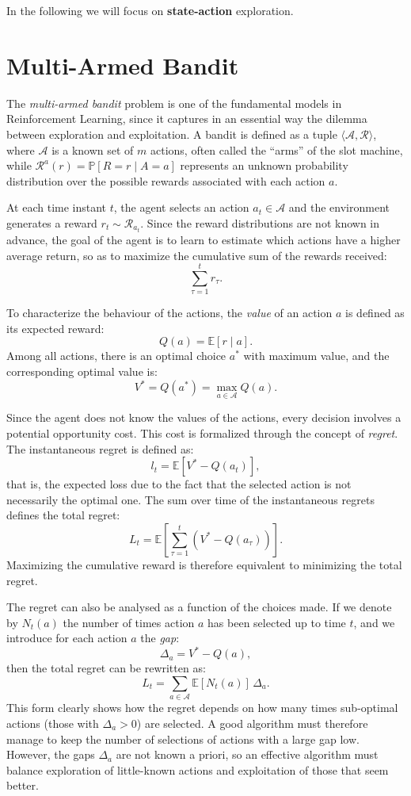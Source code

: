 In the following we will focus on \textbf{state-action} exploration.

\section{Multi-Armed Bandit}
The \emph{multi-armed bandit} problem is one of the fundamental models in Reinforcement Learning, since it captures in an essential way the dilemma between exploration and exploitation. A bandit is defined as a tuple $\langle \mathcal{A}, \mathcal{R} \rangle$, where $\mathcal{A}$ is a known set of $m$ actions, often called the ``arms'' of the slot machine, while $\mathcal{R}^a(r) = \mathbb{P}[R=r \mid A=a]$ represents an unknown probability distribution over the possible rewards associated with each action $a$.

At each time instant $t$, the agent selects an action $a_t \in \mathcal{A}$ and the environment generates a reward $r_t \sim \mathcal{R}_{a_t}$. Since the reward distributions are not known in advance, the goal of the agent is to learn to estimate which actions have a higher average return, so as to maximize the cumulative sum of the rewards received:
\[
\sum_{\tau=1}^t r_\tau .
\]

To characterize the behaviour of the actions, the \emph{value} of an action $a$ is defined as its expected reward:
\[
Q(a) = \mathbb{E}[r \mid a].
\]
Among all actions, there is an optimal choice $a^*$ with maximum value, and the corresponding optimal value is:
\[
V^* = Q(a^*) = \max_{a \in \mathcal{A}} Q(a).
\]

Since the agent does not know the values of the actions, every decision involves a potential opportunity cost. This cost is formalized through the concept of \emph{regret}. The instantaneous regret is defined as:
\[
l_t = \mathbb{E}\!\left[ V^* - Q(a_t) \right],
\]
that is, the expected loss due to the fact that the selected action is not necessarily the optimal one. The sum over time of the instantaneous regrets defines the total regret:
\[
L_t = \mathbb{E}\!\left[ \sum_{\tau=1}^t \left( V^* - Q(a_\tau) \right) \right].
\]
Maximizing the cumulative reward is therefore equivalent to minimizing the total regret.

The regret can also be analysed as a function of the choices made. If we denote by $N_t(a)$ the number of times action $a$ has been selected up to time $t$, and we introduce for each action $a$ the \emph{gap}:
\[
\Delta_a = V^* - Q(a),
\]
then the total regret can be rewritten as:
\[
L_t = \sum_{a \in \mathcal{A}} \mathbb{E}[N_t(a)] \, \Delta_a.
\]
This form clearly shows how the regret depends on how many times sub-optimal actions (those with $\Delta_a > 0$) are selected. A good algorithm must therefore manage to keep the number of selections of actions with a large gap low. However, the gaps $\Delta_a$ are not known a priori, so an effective algorithm must balance exploration of little-known actions and exploitation of those that seem better.

